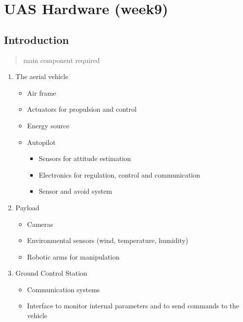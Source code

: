 \documentclass[]{article}
\begin{document}
\section{UAS Hardware (week9)}\label{header-n1824}

\subsection{Introduction}\label{header-n1825}

\begin{quote}
main component required
\end{quote}

\begin{enumerate}
\def\labelenumi{\arabic{enumi}.}
\item
  The aerial vehicle

  \begin{itemize}
  \item
    Air frame
  \item
    Actuators for propulsion and control
  \item
    Energy source
  \item
    Autopilot

    \begin{itemize}
    \item
      Sensors for attitude estimation
    \item
      Electronics for regulation, control and communication
    \item
      Sensor and avoid system
    \end{itemize}
  \end{itemize}
\item
  Payload

  \begin{itemize}
  \item
    Cameras
  \item
    Environmental sensors (wind, temperature, humidity)
  \item
    Robotic arms for manipulation
  \end{itemize}
\item
  Ground Control Station

  \begin{itemize}
  \item
    Communication systems
  \item
    Interface to monitor internal parameters and to send commands to the
    vehicle
  \end{itemize}
\end{enumerate}
\end{document}
